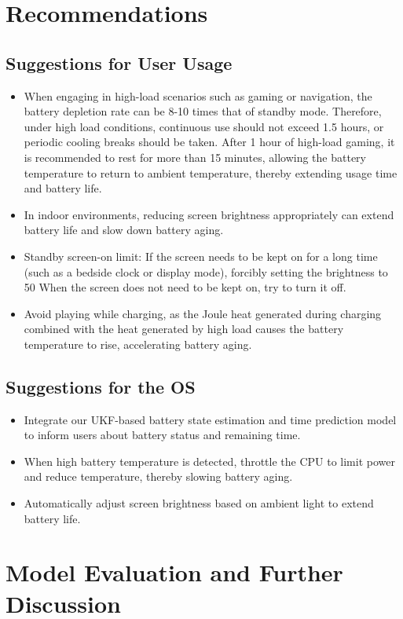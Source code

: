 \documentclass{mcmthesis}
\begin{document}
\section{Recommendations}
\subsection{Suggestions for User Usage}
\begin{itemize}
  \item When engaging in high-load scenarios such as gaming or navigation, the battery depletion rate can be 8-10 times that of standby mode.
Therefore, under high load conditions, continuous use should not exceed 1.5 hours, or periodic cooling breaks should be taken.
After 1 hour of high-load gaming, it is recommended to rest for more than 15 minutes,
allowing the battery temperature to return to ambient temperature, thereby extending usage time and battery life.
  \item In indoor environments, reducing screen brightness appropriately can extend battery life and slow down battery aging.
  \item Standby screen-on limit: If the screen needs to be kept on for a long time (such as a bedside clock or display mode), forcibly setting the brightness to 50%
When the screen does not need to be kept on, try to turn it off.
  \item Avoid playing while charging, as the Joule heat generated during charging combined with the heat generated by high load causes the battery temperature to rise, accelerating battery aging.
\end{itemize}
\subsection{Suggestions for the OS}
\begin{itemize}
  \item Integrate our UKF-based battery state estimation and time prediction model to inform users about battery status and remaining time.
  \item When high battery temperature is detected, throttle the CPU to limit power and reduce temperature, thereby slowing battery aging.
  \item Automatically adjust screen brightness based on ambient light to extend battery life.
\end{itemize}


\section{Model Evaluation and Further Discussion}
\end{document}
